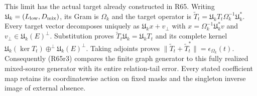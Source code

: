 This limit has the actual target already constructed in R65.
Writing $\mathfrak U_k=(L_{\rm low},D_{\rm mix})$, its
Gram is $\Omega_k$ and the target operator is
$\widetilde T_t=\mathfrak U_kT_t\Omega_k^{-1}\mathfrak U_k^*$.
Every target vector decomposes uniquely as
$\mathfrak U_kx+v_\perp$ with
$x=\Omega_k^{-1}\mathfrak U_k^*v$ and
$v_\perp\in\mathfrak U_k(E)^\perp$. Substitution proves
$\widetilde T_t\mathfrak U_k=\mathfrak U_kT_t$ and its complete
kernel $\mathfrak U_k(\ker T_t)\mathbin{\oplus^\perp}
\mathfrak U_k(E)^\perp$. Taking adjoints proves
$\|\widetilde T_t+\widetilde T_t^*\|=\epsilon_{\Omega_k}(t)$.
Consequently (R65r3) compares the finite graph generator to
this fully realized mixed-source generator with its entire
relation-tail error. Every stated coefficient map retains its
coordinatewise action on fixed masks and the singleton inverse
image of external absence.

